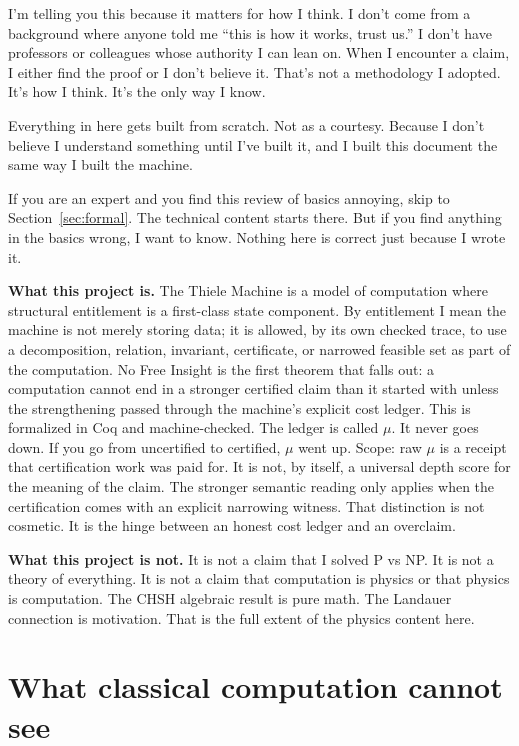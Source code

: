 \documentclass[11pt,a4paper]{article}
\theoremstyle{plain}
\theoremstyle{definition}
\theoremstyle{remark}
\begin{document}
I'm telling you this because it matters for how I think. I don't come from a background where anyone told me ``this is how it works, trust us.'' I don't have professors or colleagues whose authority I can lean on. When I encounter a claim, I either find the proof or I don't believe it. That's not a methodology I adopted. It's how I think. It's the only way I know.

Everything in here gets built from scratch. Not as a courtesy. Because I don't believe I understand something until I've built it, and I built this document the same way I built the machine.

If you are an expert and you find this review of basics annoying, skip to Section~\ref{sec:formal}. The technical content starts there. But if you find anything in the basics wrong, I want to know. Nothing here is correct just because I wrote it.

\medskip

\textbf{What this project is.} The Thiele Machine is a model of computation where structural entitlement is a first-class state component. By entitlement I mean the machine is not merely storing data; it is allowed, by its own checked trace, to use a decomposition, relation, invariant, certificate, or narrowed feasible set as part of the computation. No Free Insight is the first theorem that falls out: a computation cannot end in a stronger certified claim than it started with unless the strengthening passed through the machine's explicit cost ledger. This is formalized in Coq and machine-checked. The ledger is called $\mu$. It never goes down. If you go from uncertified to certified, $\mu$ went up. Scope: raw $\mu$ is a receipt that certification work was paid for. It is not, by itself, a universal depth score for the meaning of the claim. The stronger semantic reading only applies when the certification comes with an explicit narrowing witness. That distinction is not cosmetic. It is the hinge between an honest cost ledger and an overclaim.

\textbf{What this project is not.} It is not a claim that I solved P vs NP. It is not a theory of everything. It is not a claim that computation is physics or that physics is computation. The CHSH algebraic result is pure math. The Landauer connection is motivation. That is the full extent of the physics content here.

\section{What classical computation cannot see}
\label{sec:turing}
\end{document}
